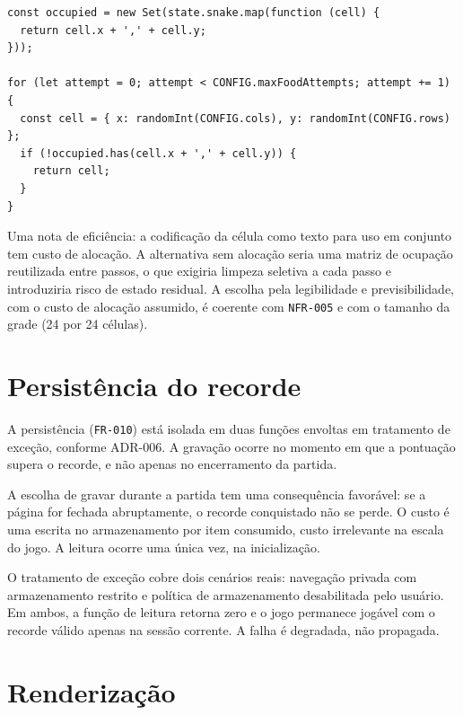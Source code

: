 \begin{quadro}[htb]
	\caption{Trecho do sorteio de célula livre para o alvo (excertado)}
	\label{qua:codigo-alvo}
	\begin{lstlisting}[style=codigo]
const occupied = new Set(state.snake.map(function (cell) {
  return cell.x + ',' + cell.y;
}));

for (let attempt = 0; attempt < CONFIG.maxFoodAttempts; attempt += 1) {
  const cell = { x: randomInt(CONFIG.cols), y: randomInt(CONFIG.rows) };
  if (!occupied.has(cell.x + ',' + cell.y)) {
    return cell;
  }
}
	\end{lstlisting}
\end{quadro}

Uma nota de eficiência: a codificação da célula como texto para uso em conjunto
tem custo de alocação. A alternativa sem alocação seria uma matriz de ocupação
reutilizada entre passos, o que exigiria limpeza seletiva a cada passo e
introduziria risco de estado residual. A escolha pela legibilidade e
previsibilidade, com o custo de alocação assumido, é coerente com
\texttt{NFR-005} e com o tamanho da grade (24 por 24 células).

\section{Persistência do recorde}
\label{sec:impl-persistencia}

A persistência (\texttt{FR-010}) está isolada em duas funções envoltas em
tratamento de exceção, conforme ADR-006. A gravação ocorre no momento em que a
pontuação supera o recorde, e não apenas no encerramento da partida.

A escolha de gravar durante a partida tem uma consequência favorável: se a página
for fechada abruptamente, o recorde conquistado não se perde. O custo é uma
escrita no armazenamento por item consumido, custo irrelevante na escala do jogo.
A leitura ocorre uma única vez, na inicialização.

O tratamento de exceção cobre dois cenários reais: navegação privada com
armazenamento restrito e política de armazenamento desabilitada pelo usuário. Em
ambos, a função de leitura retorna zero e o jogo permanece jogável com o recorde
válido apenas na sessão corrente. A falha é degradada, não propagada.

\section{Renderização}
\label{sec:impl-render}

